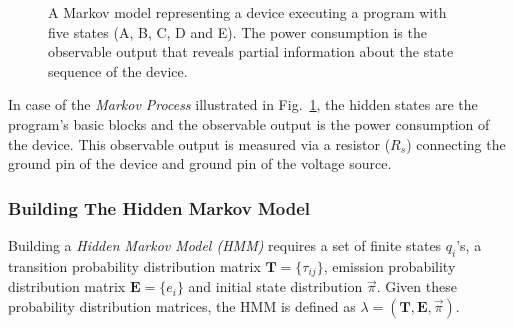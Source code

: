 \documentclass[lnicst]{svmultln}
\begin{document}
\begin{figure}[ht!]
	\caption{A Markov model representing a device executing a program with five states (A, B, C, D and E). The power consumption is the observable output that reveals partial information about the state sequence of the device.}\label{fig:hmm-model-processor}
\end{figure}

In case of the \emph{Markov Process} illustrated in Fig.~\ref{fig:hmm-model-processor}, the hidden states are the program's basic blocks and the observable output is the power consumption of the device. This observable output is measured via a resistor ($R_{s}$) connecting the ground pin of the device and ground pin of the voltage source.

\subsubsection{Building The Hidden Markov Model}
\label{subsubsec:build-hmm}

Building a \emph{Hidden Markov Model (HMM)} requires a set of finite states $q_{i}$'s, a transition probability distribution matrix $\mathbf{T}=\{ \tau_{ij} \}$, emission probability distribution matrix $\mathbf{E}=\{ e_{i} \}$ and initial state distribution $\vec{\pi}$. Given these probability distribution matrices, the HMM is defined as $\lambda =(\mathbf{T},\mathbf{E},\vec{\pi})$.
\end{document}
